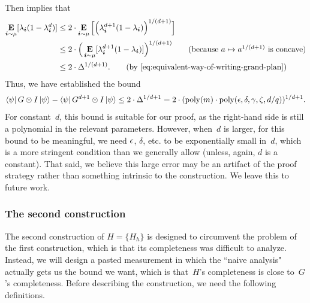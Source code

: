 Then  implies that
\begin{align*}
\E_{\bi \sim\mu}[\lambda_{\bi}(1-\lambda_{\bi}^d)]
&\leq 2\cdot \E_{\bi \sim\mu}\Big[\Big(\lambda_{\bi}^{d+1}(1-\lambda_{\bi})\Big)^{1/(d+1)}\Big]\\
&\leq2\cdot \Big(\E_{\bi \sim\mu}[\lambda_{\bi}^{d+1}(1-\lambda_{\bi})]\Big)^{1/(d+1)}
							\tag{because $a \mapsto a^{1/(d+1)}$ is concave}\\
&\leq 2 \cdot \Delta^{1/(d+1)}. \tag{by \Cref{eq:equivalent-way-of-writing-grand-plan}}
\end{align*}
Thus, we have established the bound
\begin{equation*}
\bra{\psi}G \otimes I \ket{\psi}
- \bra{\psi}G^{d+1} \otimes I \ket{\psi}
\leq 2\cdot \Delta^{1/{d+1}}
= 2\cdot ( \mathrm{poly}(m) \cdot \mathrm{poly}(\epsilon, \delta, \gamma, \zeta,d/q))^{1/{d+1}}.
\end{equation*}
For constant~$d$, this bound is suitable for our proof, as the right-hand side is still a polynomial in the relevant parameters.
However, when~$d$ is larger, for this bound to be meaningful, we need $\epsilon$, $\delta$, etc. to be exponentially small in~$d$, which is a more stringent condition than we generally allow (unless, again, $d$ is a constant). 
That said, we believe this large error may be an artifact of the proof strategy
rather than something intrinsic to the construction.
We leave this to future work.



\subsubsection{The second construction}\label{sec:construction-numba-two}

The second construction of $H = \{H_h\}$ 
is designed to circumvent the problem of the first construction,
which is that its completeness was difficult to analyze.
Instead, we will design a pasted measurement
in which the ``naive analysis" actually gets us the bound we want,
which is that~$H$'s completeness is close to~$G$'s completeness.
Before describing the construction, we need the following definitions.

